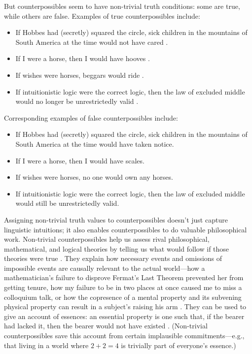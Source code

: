 But counterpossibles seem to have non-trivial truth conditions: some are true, while others are false.  Examples of true counterpossibles include:
\begin{itemize}
\item[] If Hobbes had (secretly) squared the circle, sick children in the mountains of South America at the time would not have cared \citep[544]{Nolan1997-DANIWA}.
\item[] If I were a horse, then I would have hooves \citep[10]{Krakauer2012-KRAC-2}.
\item[] If wishes were horses, beggars would ride \citep[10]{Krakauer2012-KRAC-2}.
\item[] If intuitionistic logic were the correct logic, then the law of excluded middle would no longer be unrestrictedly valid \citep[adapted from][]{Brogaard2013-BROROC-3}.
\end{itemize}
Corresponding examples of false counterpossibles include:
\begin{itemize}
\item[] If Hobbes had (secretly) squared the circle, sick children in the mountains of South America at the time would have taken notice.
\item[] If I were a horse, then I would have scales.
\item[] If wishes were horses, no one would own any horses.
\item[] If intuitionistic logic were the correct logic, then the law of excluded middle would still be unrestrictedly valid.
\end{itemize}

Assigning non-trivial truth values to counterpossibles doesn't just capture linguistic intuitions; it also enables counterpossibles to do valuable philosophical work.  Non-trivial counterpossibles help us assess rival philosophical, mathematical, and logical theories by telling us what would follow if those theories were true \citep{Krakauer2012-KRAC-2, Brogaard2013-BROROC-3, Nolan1997-DANIWA}.   They explain how necessary events and omissions of impossible events are causally relevant to the actual world---how a mathematician's failure to disprove Fermat's Last Theorem prevented her from getting tenure, how my failure to be in two places at once caused me to miss a colloquium talk, or how the copresence of a mental property and its subvening physical property can result in a subject's raising his arm \citep{BernsteinForthcoming-BEROI-3}.  They can be used to give an account of essences: an essential property is one such that, if the bearer had lacked it, then the bearer would not have existed \citep{Brogaard2013-BROROC-3, BrogaardForthcoming-BROACA-2}.  (Non-trivial counterpossibles save this account from certain implausible commitments---e.g., that living in a world where $2+2=4$ is trivially part of everyone's essence.)

